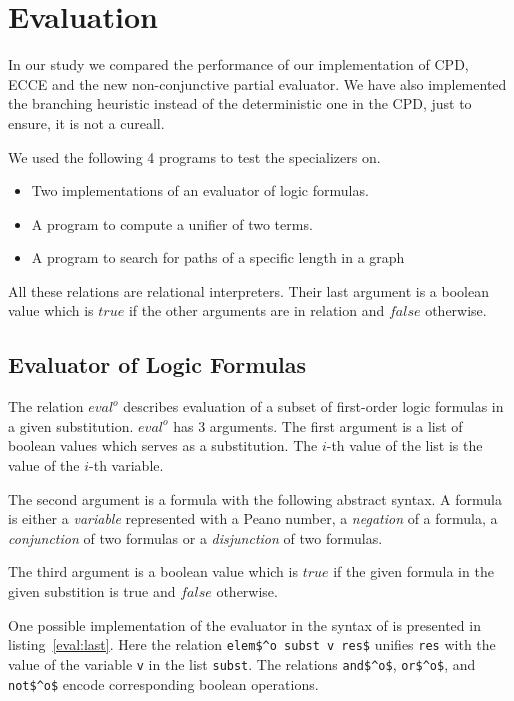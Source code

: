 \section{Evaluation}

In our study we compared the performance of our implementation of CPD, ECCE and the new non-conjunctive partial evaluator.
We have also implemented the branching heuristic instead of the deterministic one in the CPD, just to ensure, it is not a cureall.

We used the following 4 programs to test the specializers on.
\begin{itemize}
  \item Two implementations of an evaluator of logic formulas.
  \item A program to compute a unifier of two terms.
  \item A program to search for paths of a specific length in a graph
\end{itemize}

All these relations are relational interpreters.
Their last argument is a boolean value which is $true$ if the other arguments are in relation and $false$ otherwise.

\subsection{Evaluator of Logic Formulas}

The relation $eval^o$ describes evaluation of a subset of first-order logic formulas in a given substitution.
$eval^o$ has 3 arguments.
The first argument is a list of boolean values which serves as a substitution.
The $i$-th value of the list is the value of the $i$-th variable.

The second argument is a formula with the following abstract syntax.
A formula is either a \emph{variable} represented with a Peano number, a \emph{negation} of a formula, a \emph{conjunction} of two formulas or a \emph{disjunction} of two formulas.

The third argument is a boolean value which is $true$ if the given formula in the given substition is true and $false$ otherwise.

One possible implementation of the evaluator in the syntax of \oc{} is presented in listing~\ref{eval:last}.
Here the relation \lstinline{elem$^o subst v res$} unifies \lstinline{res} with the value of the variable \lstinline{v} in the list \lstinline{subst}.
The relations \lstinline{and$^o$}, \lstinline{or$^o$}, and \lstinline{not$^o$} encode corresponding boolean operations.

